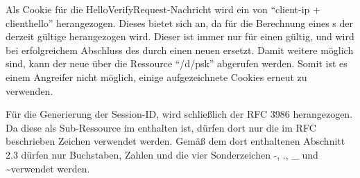 Als Cookie für die HelloVerifyRequest-Nachricht wird ein  von "`client-ip + clienthello"' herangezogen. Dieses bietet sich an, da für die Berechnung eines
s der derzeit gültige  herangezogen wird. Dieser ist immer nur für einen  gültig, und wird bei erfolgreichem Abschluss des
 durch einen neuen  ersetzt. Damit weitere  möglich sind, kann der neue  über die Ressource "`/d/psk"'
abgerufen werden. Somit ist es einem Angreifer nicht möglich, einige aufgezeichnete Cookies erneut zu verwenden.

Für die Generierung der Session-ID, wird schließlich der RFC 3986 \cite{rfc3986} herangezogen. Da diese als Sub-Ressource im  enthalten ist,
dürfen dort nur die im RFC beschrieben Zeichen verwendet werden. Gemäß dem dort enthaltenen Abschnitt 2.3 dürfen nur Buchstaben, Zahlen und die vier
Sonderzeichen -, ., \_ und \textasciitilde verwendet werden.